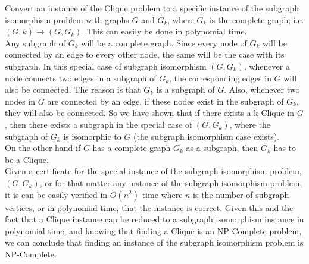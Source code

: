 \documentclass[paper=a4, fontsize=11pt]{scrartcl} %
\numberwithin{equation}{section} %
\numberwithin{figure}{section} %
\numberwithin{table}{section} %
\begin{document}
\begin{enumerate}
Convert an instance of the Clique problem to a specific instance of the subgraph isomorphism problem with graphs $G$ and $G_k$, where $G_k$ is the complete graph; i.e. $(G, k) \rightarrow (G, G_k)$. This can easily be done in polynomial time.\\ 

Any subgraph of $G_k$ will be a complete graph. Since every node of $G_k$ will be connected by an edge to every other node, the same will be the case with its subgraph. In this special case of subgraph isomorphism $(G, G_k)$, whenever a node connects two edges in a subgraph of $G_k$, the corresponding edges in $G$ will also be connected. The reason is that $G_k$ is a subgraph of $G$. Also, whenever two nodes in $G$ are connected by an edge, if these nodes exist in the subgraph of $G_k$, they will also be connected. So we have shown that if there exists a k-Clique in $G$, then there exists a subgraph in the special case of $(G, G_k)$, where the subgraph of $G_k$ is isomorphic to $G$ (the subgraph isomorphism case exists).\\

On the other hand if $G$ has a complete graph $G_k$ as a subgraph, then $G_k$ has to be a Clique.\\

Given a certificate for the special instance of the subgraph isomorphism problem, $(G, G_k)$, or for that matter any instance of the subgraph isomorphism problem, it is can be easily verified in $O(n^2)$ time where $n$ is the number of subgraph vertices, or in polynomial time, that the instance is correct. Given this and the fact that a Clique instance can be reduced to a subgraph isomorphism instance in polynomial time, and knowing that finding a Clique is an NP-Complete problem, we can conclude that finding an instance of the subgraph isomorphism problem is NP-Complete. 
\end{enumerate}

\end{document}
